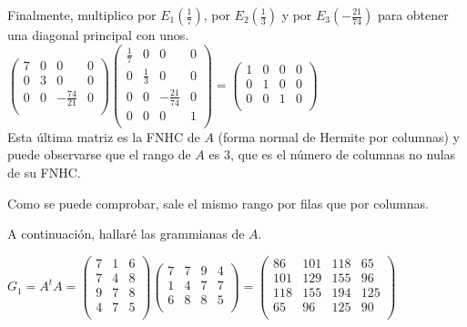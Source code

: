 \documentclass[11pt, a4paper]{article}
\newif\IfInSansMode
\theoremstyle{theorem-style}
\theoremstyle{definition-style}
\theoremstyle{remark-style}
\theoremstyle{example-style}
\begin{document}
Finalmente, multiplico por $E_1(\frac{1}{7})$, por $E_2(\frac{1}{3})$ y por $E_3(-\frac{21}{74})$ para obtener una diagonal principal con unos. \\

$\begin{pmatrix}
7 & 0 & 0 & 0 \\
0 & 3 & 0 & 0 \\
0 & 0 & -\frac{74}{21} & 0 \\
\end{pmatrix}
\begin{pmatrix}
\frac{1}{7} & 0 & 0 & 0 \\
0 & \frac{1}{3} & 0 & 0 \\
0 & 0 & -\frac{21}{74} & 0 \\
0 & 0 & 0 & 1 \\
\end{pmatrix}    
 = 
\begin{pmatrix}
1 & 0 & 0 & 0 \\
0 & 1 & 0 & 0 \\
0 & 0 & 1 & 0 \\
\end{pmatrix}$ \\

Esta última matriz es la FNHC de $A$ (forma normal de Hermite por columnas) y puede observarse que el rango de $A$ es 3, que es el número de columnas no nulas de su FNHC.

Como se puede comprobar, sale el mismo rango por filas que por columnas.

A continuación, hallaré las grammianas de $A$.

$G_1 = A^tA = \begin{pmatrix}
7 & 1 & 6 \\
7 & 4 & 8 \\
9 & 7 & 8 \\
4 & 7 & 5 \\
\end{pmatrix}
\begin{pmatrix}
7 & 7 & 9 & 4 \\
1 & 4 & 7 & 7 \\
6 & 8 & 8 & 5 \\
\end{pmatrix} = 
\begin{pmatrix}
86 & 101 & 118 & 65 \\
101 & 129 & 155 & 96 \\
118 & 155 & 194 & 125 \\
65 & 96 & 125 & 90 \\
\end{pmatrix}$ \\
\end{document}
